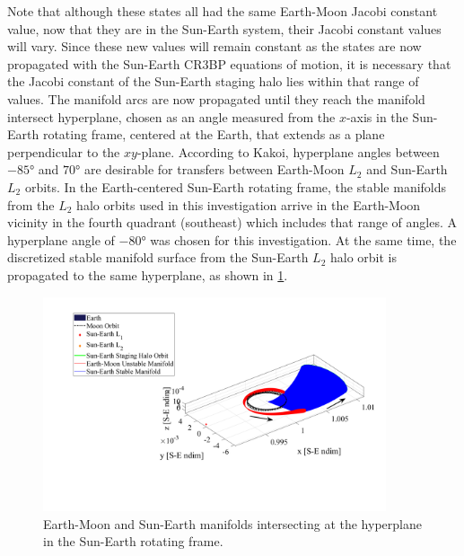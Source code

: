 Note that although these states all had the same Earth-Moon Jacobi constant value, now that they
are in the Sun-Earth system, their Jacobi constant values will vary. Since these new values will
remain constant as the states are now propagated with the Sun-Earth CR3BP equations of motion, it
is necessary that the Jacobi constant of the Sun-Earth staging halo lies within that range of
values. The manifold arcs are now propagated until they reach the manifold intersect hyperplane,
chosen as an angle measured from the $x$-axis in the Sun-Earth rotating frame, centered at the
Earth, that extends as a plane perpendicular to the $xy$-plane. According to Kakoi, hyperplane
angles between $-\ang{85}$ and $\ang{70}$ are desirable for transfers between Earth-Moon $L_{2}$
and Sun-Earth $L_{2}$ orbits\cite{Kakoi:2015}. In the Earth-centered Sun-Earth rotating frame, the
stable manifolds from the $L_{2}$ halo orbits used in this investigation arrive in the Earth-Moon
vicinity in the fourth quadrant (southeast) which includes that range of angles. A hyperplane angle
of $\ang{-80}$ was chosen for this investigation. At the same time, the discretized stable manifold
surface from the Sun-Earth $L_{2}$ halo orbit is propagated to the same hyperplane, as shown in
\cref{fig:hyperplane}.

\begin{figure}[ht]
    \centering
    \includegraphics[width=0.9\textwidth]{figures/Hyperplane.pdf}
    \caption{Earth-Moon and Sun-Earth manifolds intersecting at the hyperplane in the Sun-Earth rotating frame.}
    \label{fig:hyperplane}
\end{figure}

